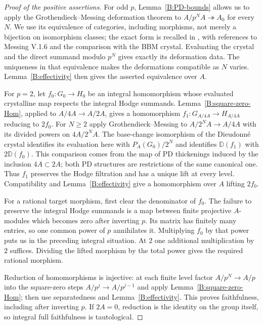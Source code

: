 \begin{proof}[Proof of the positive assertions]
For odd $p$, Lemma~\ref{B:PD-bounds} allows us to apply the
Grothendieck--Messing deformation theorem to
$A/p^NA\twoheadrightarrow A_0$ for every $N$. We use its equivalence
of categories, including morphisms, not merely a bijection on
isomorphism classes; the exact form is recalled in
\cite[Remark 2.6]{B:LauSmoothness}, with references to Messing V.1.6
and the comparison with the BBM crystal. Evaluating the crystal and
the direct summand modulo $p^N$ gives exactly its deformation data.
The uniqueness in that equivalence makes the deformations compatible
as $N$ varies. Lemma~\ref{B:effectivity} then gives the asserted
equivalence over $A$.

For $p=2$, let $f_0:G_0\to H_0$ be an integral homomorphism whose
evaluated crystalline map respects the integral Hodge summands.
Lemma~\ref{B:square-zero-Hom}, applied to $A/4A\to A/2A$, gives a
homomorphism $f_1:G_{A/4A}\to H_{A/4A}$ reducing to $2f_0$.
For $N\geq2$ apply Grothendieck--Messing to
$A/2^NA\to A/4A$ with its divided powers on $4A/2^NA$.
The base-change isomorphism of the Dieudonn\'e crystal identifies
its evaluation here with $P_A(G_0)/2^N$ and identifies
$\mathbb D(f_1)$ with $2\mathbb D(f_0)$. This comparison comes from the
map of PD thickenings induced by the inclusion $4A\subset2A$; both
PD structures are restrictions of the same canonical one.
Thus $f_1$ preserves the Hodge filtration and has a unique lift at
every level. Compatibility and Lemma~\ref{B:effectivity} give a
homomorphism over $A$ lifting $2f_0$.

For a rational target morphism, first clear the denominator of $f_0$.
The failure to preserve the integral Hodge summands is a map between
finite projective $A$-modules which becomes zero after inverting $p$.
Its matrix has finitely many entries, so one common power of $p$
annihilates it. Multiplying $f_0$ by that power puts us in the preceding
integral situation. At $2$ one additional multiplication by $2$
suffices. Dividing the lifted morphism by the total power gives the
required rational morphism.

Reduction of homomorphisms is injective: at each finite level factor
$A/p^N\to A/p$ into the square-zero steps
$A/p^j\to A/p^{j-1}$ and apply
Lemma~\ref{B:square-zero-Hom}; then use separatedness and
Lemma~\ref{B:effectivity}. This proves faithfulness, including after
inverting $p$. If $2A=0$, reduction is the identity on the group
itself, so integral full faithfulness is tautological.
\end{proof}

